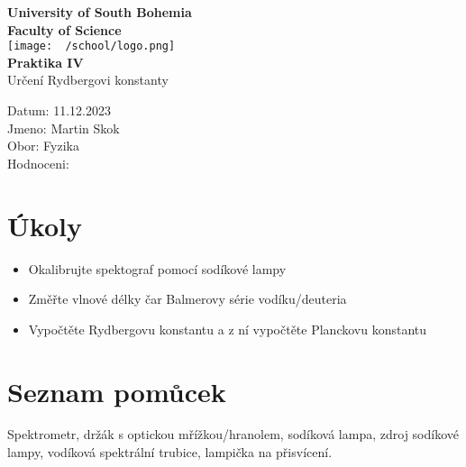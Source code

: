 \documentclass{article}
\begin{document}
\begin{center}
\textbf{\Huge{University of South Bohemia}}\\
\vspace{50px}
\textbf{\Large{Faculty of Science}} \\
\vspace{30px}
\texttt{[image: ~/school/logo.png]} \\
\vspace{30px}
\textbf{\large{Praktika IV}}
\vspace{20px}
\\
\vspace{20px}
\large{Určení Rydbergovi konstanty} \\
\vspace{60px}
\end{center}
\begin{flushleft}
Datum: 11.12.2023 \\
Jmeno: Martin Skok \\
Obor: Fyzika \\
Hodnoceni:
\end{flushleft}
\newpage
\section{Úkoly}
\begin{itemize}
        \item Okalibrujte spektograf pomocí sodíkové lampy
        \item Změřte vlnové délky čar Balmerovy série vodíku/deuteria
        \item Vypočtěte Rydbergovu konstantu a z ní vypočtěte Planckovu konstantu
\end{itemize}

\section{Seznam pomůcek}
Spektrometr, držák s optickou mřížkou/hranolem, sodíková lampa, zdroj sodíkové lampy,
vodíková spektrální trubice, lampička na přisvícení.
\end{document}
